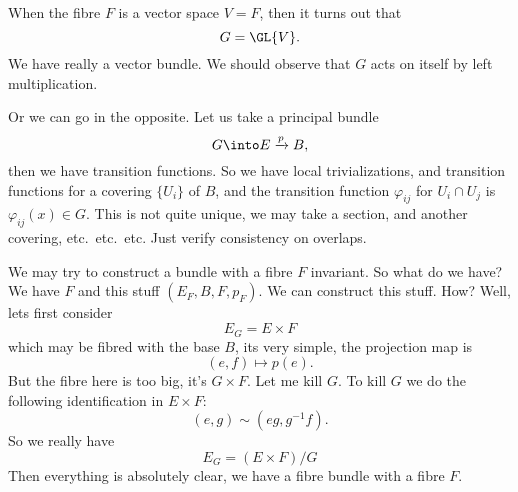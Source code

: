 When the fibre $F$ is a vector space $V=F$, then it turns out
that
\begin{equation}
G=\GL{V}.
\end{equation}
We have really a vector bundle. We should observe that $G$ acts
on itself by left multiplication. 

Or we can go in the opposite. Let us take a principal bundle
\begin{equation}
G\into E\xrightarrow{p}B,
\end{equation}
then we have transition functions. So we have local
trivializations, and transition functions for a covering
$\{U_{i}\}$ of $B$, and the transition function $\varphi_{ij}$
for $U_{i}\cap U_{j}$ is $\varphi_{ij}(x)\in G$. This is not
quite unique, we may take a section, and another covering,
etc.\ etc.\ etc. Just verify consistency on overlaps.

We may try to construct a bundle with a fibre $F$ invariant. So
what do we have? We have $F$ and this stuff $(E_{F}, B, F,
p_{F})$. We can construct this stuff. How? Well, lets first
consider
\begin{equation}
E_{G}=E\times F
\end{equation}
which may be fibred with the base $B$, its very simple, the
projection map is
\begin{equation}
(e,f)\mapsto p(e).
\end{equation}
But the fibre here is too big, it's $G\times F$. Let me kill
$G$. To kill $G$ we do the following identification in $E\times
F$:
\begin{equation}
(e,g)\sim (eg,g^{-1}f).
\end{equation}
So we really have
\begin{equation}
E_{G}=(E\times F)/G
\end{equation}
Then everything is absolutely clear, we have a fibre bundle with
a fibre $F$.
